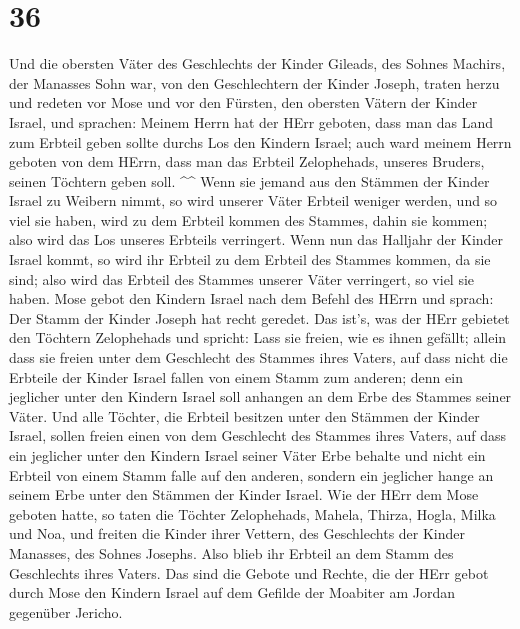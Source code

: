 \hypertarget{section-6}{%
\section{36}\label{section-6}}

 Und die obersten Väter des Geschlechts der Kinder Gileads,
des Sohnes Machirs, der Manasses Sohn war, von den Geschlechtern der
Kinder Joseph, traten herzu und redeten vor Mose und vor den Fürsten,
den obersten Vätern der Kinder Israel,  und sprachen: Meinem
Herrn hat der HErr geboten, dass man das Land zum Erbteil geben sollte
durchs Los den Kindern Israel; auch ward meinem Herrn geboten von dem
HErrn, dass man das Erbteil Zelophehads, unseres Bruders, seinen
Töchtern geben soll. \^{}\^{}  Wenn sie jemand aus den
Stämmen der Kinder Israel zu Weibern nimmt, so wird unserer Väter
Erbteil weniger werden, und so viel sie haben, wird zu dem Erbteil
kommen des Stammes, dahin sie kommen; also wird das Los unseres Erbteils
verringert.  Wenn nun das Halljahr der Kinder Israel kommt,
so wird ihr Erbteil zu dem Erbteil des Stammes kommen, da sie sind; also
wird das Erbteil des Stammes unserer Väter verringert, so viel sie
haben.  Mose gebot den Kindern Israel nach dem Befehl des
HErrn und sprach: Der Stamm der Kinder Joseph hat recht geredet.
 Das ist's, was der HErr gebietet den Töchtern Zelophehads
und spricht: Lass sie freien, wie es ihnen gefällt; allein dass sie
freien unter dem Geschlecht des Stammes ihres Vaters,  auf
dass nicht die Erbteile der Kinder Israel fallen von einem Stamm zum
anderen; denn ein jeglicher unter den Kindern Israel soll anhangen an
dem Erbe des Stammes seiner Väter.  Und alle Töchter, die
Erbteil besitzen unter den Stämmen der Kinder Israel, sollen freien
einen von dem Geschlecht des Stammes ihres Vaters, auf dass ein
jeglicher unter den Kindern Israel seiner Väter Erbe behalte
 und nicht ein Erbteil von einem Stamm falle auf den
anderen, sondern ein jeglicher hange an seinem Erbe unter den Stämmen
der Kinder Israel.  Wie der HErr dem Mose geboten hatte, so
taten die Töchter Zelophehads,  Mahela, Thirza, Hogla,
Milka und Noa, und freiten die Kinder ihrer Vettern,  des
Geschlechts der Kinder Manasses, des Sohnes Josephs. Also blieb ihr
Erbteil an dem Stamm des Geschlechts ihres Vaters.  Das
sind die Gebote und Rechte, die der HErr gebot durch Mose den Kindern
Israel auf dem Gefilde der Moabiter am Jordan gegenüber Jericho.
